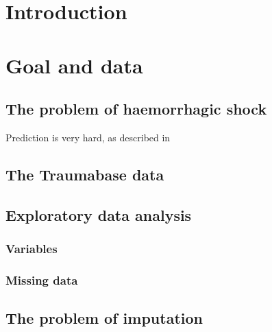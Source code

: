 \documentclass[12pt, a4paper]{memoir}
\begin{document}
\tableofcontents*
\vspace*{\fill}

\chapter*{Introduction}

\chapter{Goal and data}
\label{data}
	\section{The problem of haemorrhagic shock}
	Prediction is very hard, as described in \cite{doctors_prediction}
	\section{The Traumabase data}
	\section{Exploratory data analysis}
		\subsection{Variables}
		\subsection{Missing data}
	\section{The problem of imputation}
\end{document}
